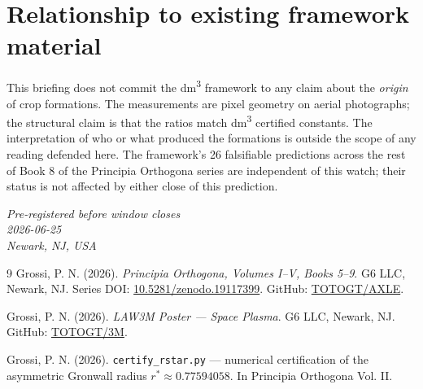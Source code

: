 \documentclass[11pt,a4paper]{article}
\begin{document}
\section{Relationship to existing framework material}

This briefing does not commit the dm\textsuperscript{3} framework to any claim about the \emph{origin} of crop formations. The measurements are pixel geometry on aerial photographs; the structural claim is that the ratios match dm\textsuperscript{3} certified constants. The interpretation of who or what produced the formations is outside the scope of any reading defended here. The framework's 26 falsifiable predictions across the rest of Book 8 of the Principia Orthogona series \cite{principia2026} are independent of this watch; their status is not affected by either close of this prediction.

\bigskip

\begin{flushright}
\small\itshape
Pre-registered before window closes \\
2026-06-25 \\
Newark, NJ, USA
\end{flushright}

\begin{thebibliography}{9}
 Grossi, P. N. (2026). \textit{Principia Orthogona, Volumes I--V, Books 5--9}. G6 LLC, Newark, NJ. Series DOI: \href{https://doi.org/10.5281/zenodo.19117399}{10.5281/zenodo.19117399}. GitHub: \href{https://github.com/TOTOGT/AXLE}{TOTOGT/AXLE}.

 Grossi, P. N. (2026). \textit{LAW3M Poster --- Space Plasma}. G6 LLC, Newark, NJ. GitHub: \href{https://github.com/TOTOGT/3M}{TOTOGT/3M}.

 Grossi, P. N. (2026). \texttt{certify\_rstar.py} --- numerical certification of the asymmetric Gronwall radius $r^* \approx 0.77594058$. In Principia Orthogona Vol. II.
\end{thebibliography}
\end{document}

